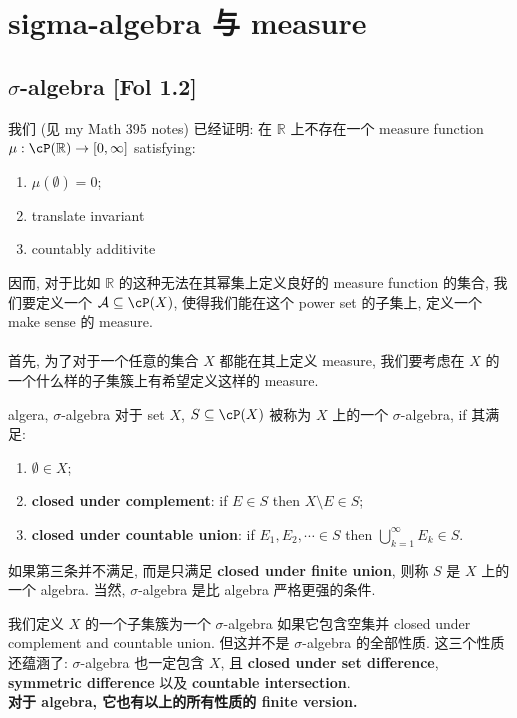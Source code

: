 \chapter{sigma-algebra 与 measure}

\section{$\sigma$-algebra [Fol 1.2]}
\noindent 我们 (见 my Math 395 notes) 已经证明: 在 $\mathbb{R}$ 上不存在一个 measure function $\mu : \cP(\mathbb{R}) \rar [0,\infty]$ satisfying:
\begin{enumerate}
    \item $\mu(\emptyset) = 0$;
    \item translate invariant
    \item countably additivite
\end{enumerate}

\noindent 因而, 对于比如 $\mathbb{R}$ 的这种无法在其幂集上定义良好的 measure function 的集合, 我们要定义一个 $\mathcal{A} \sub \cP(X)$, 使得我们能在这个 power set 的子集上, 定义一个 make sense 的 measure.\\\\
\noindent 
首先, 为了对于一个任意的集合 $X$ 都能在其上定义 measure, 我们要考虑在 $X$ 的一个什么样的子集簇上有希望定义这样的 measure. 

\begin{definition}{algera, $\sigma$-algebra}
对于 set $X$, $S \sub \cP(X)$ 被称为 $X$ 上的一个 $\sigma$-algebra, if 其满足:
\begin{enumerate}
    \item $\emptyset \in X$;
    \item \textbf{closed under complement}: if $E \in S$ then $X \setminus E \in S$;
    \item \textbf{closed under countable union}: if $E_1,E_2,\cdots \in S$ then $\bigcup_{k=1}^\infty E_k \in S$.
\end{enumerate}
如果第三条并不满足, 而是只满足 \textbf{closed under finite union}, 则称 $S$ 是 $X$ 上的一个 algebra. 当然, $\sigma$-algebra 是比 algebra 严格更强的条件.
\end{definition}

\noindent 我们定义 $X$ 的一个子集簇为一个 $\sigma$-algebra 如果它包含空集并 closed under complement and countable union. 但这并不是 $\sigma$-algebra 的全部性质. 这三个性质还蕴涵了: $\sigma$-algebra 也一定包含 $X$, 且 \textbf{closed under set difference}, \textbf{symmetric difference} 以及 \textbf{countable intersection}. \\
\noindent \textbf{对于 algebra, 它也有以上的所有性质的 finite version.}


